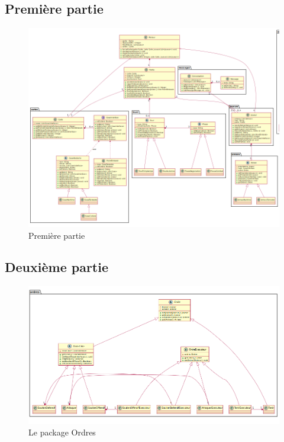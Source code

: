 \subsection{Première partie}
	\vspace{10mm}
	\begin{figure}[!h]
		\centering
		\includegraphics[angle=90,width=150mm]{images/DP1.png}
		\caption{Première partie}
	\end{figure}
\newpage
\subsection{Deuxième partie}
	\vspace{10mm}
	\begin{figure}[!h]
		\centering
		\includegraphics[scale=0.4]{images/DP2.png}
		\caption{Le package Ordres}
	\end{figure}

